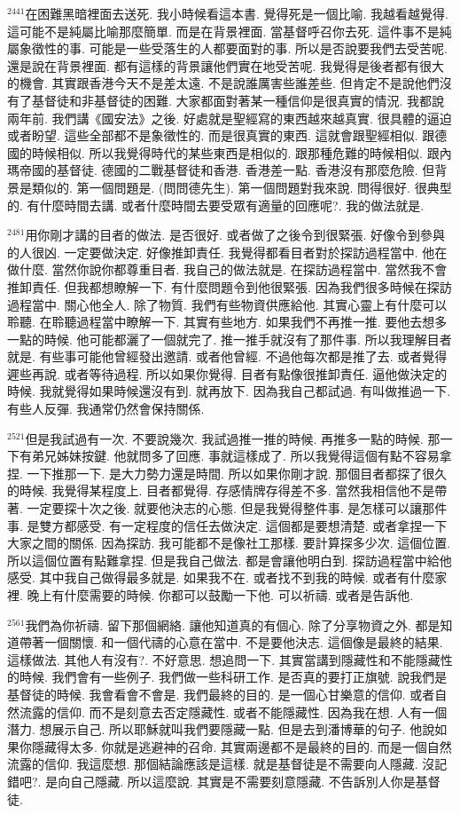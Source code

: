 \documentclass{book}
\begin{document}
$^{2441}$在困難黑暗裡面去送死.
我小時候看這本書.
覺得死是一個比喻.
我越看越覺得.
這可能不是純屬比喻那麼簡單.
而是在背景裡面.
當基督呼召你去死.
這件事不是純屬象徵性的事.
可能是一些受落生的人都要面對的事.
所以是否說要我們去受苦呢.
還是說在背景裡面.
都有這樣的背景讓他們實在地受苦呢.
我覺得是後者都有很大的機會.
其實跟香港今天不是差太遠.
不是說誰厲害些誰差些.
但肯定不是說他們沒有了基督徒和非基督徒的困難.
大家都面對著某一種信仰是很真實的情況.
我都說兩年前.
我們講《國安法》之後.
好處就是聖經寫的東西越來越真實.
很具體的逼迫或者盼望.
這些全部都不是象徵性的.
而是很真實的東西.
這就會跟聖經相似.
跟德國的時候相似.
所以我覺得時代的某些東西是相似的.
跟那種危難的時候相似.
跟內瑪帝國的基督徒.
德國的二戰基督徒和香港.
香港差一點.
香港沒有那麼危險.
但背景是類似的.
第一個問題是.
(問問德先生).
第一個問題對我來說.
問得很好.
很典型的.
有什麼時間去講.
或者什麼時間去要受眾有適量的回應呢?.
我的做法就是.

$^{2481}$用你剛才講的目者的做法.
是否很好.
或者做了之後令到很緊張.
好像令到參與的人很凶.
一定要做決定.
好像推卸責任.
我覺得都看目者對於探訪過程當中.
他在做什麼.
當然你說你都尊重目者.
我自己的做法就是.
在探訪過程當中.
當然我不會推卸責任.
但我都想瞭解一下.
有什麼問題令到他很緊張.
因為我們很多時候在探訪過程當中.
關心他全人.
除了物質.
我們有些物資供應給他.
其實心靈上有什麼可以聆聽.
在聆聽過程當中瞭解一下.
其實有些地方.
如果我們不再推一推.
要他去想多一點的時候.
他可能都灑了一個就完了.
推一推手就沒有了那件事.
所以我理解目者就是.
有些事可能他曾經發出邀請.
或者他曾經.
不過他每次都是推了去.
或者覺得遲些再說.
或者等待過程.
所以如果你覺得.
目者有點像很推卸責任.
逼他做決定的時候.
我就覺得如果時候還沒有到.
就再放下.
因為我自己都試過.
有叫做推過一下.
有些人反彈.
我通常仍然會保持關係.

$^{2521}$但是我試過有一次.
不要說幾次.
我試過推一推的時候.
再推多一點的時候.
那一下有弟兄姊妹按鍵.
他就問多了回應.
事就這樣成了.
所以我覺得這個有點不容易拿捏.
一下推那一下.
是大力勢力還是時間.
所以如果你剛才說.
那個目者都探了很久的時候.
我覺得某程度上.
目者都覺得.
存感情牌存得差不多.
當然我相信他不是帶著.
一定要探十次之後.
就要他決志的心態.
但是我覺得整件事.
是怎樣可以讓那件事.
是雙方都感受.
有一定程度的信任去做決定.
這個都是要想清楚.
或者拿捏一下大家之間的關係.
因為探訪.
我可能都不是像社工那樣.
要計算探多少次.
這個位置.
所以這個位置有點難拿捏.
但是我自己做法.
都是會讓他明白到.
探訪過程當中給他感受.
其中我自己做得最多就是.
如果我不在.
或者找不到我的時候.
或者有什麼家裡.
晚上有什麼需要的時候.
你都可以鼓勵一下他.
可以祈禱.
或者是告訴他.

$^{2561}$我們為你祈禱.
留下那個網絡.
讓他知道真的有個心.
除了分享物資之外.
都是知道帶著一個關懷.
和一個代禱的心意在當中.
不是要他決志.
這個像是最終的結果.
這樣做法.
其他人有沒有?.
不好意思.
想追問一下.
其實當講到隱藏性和不能隱藏性的時候.
我們會有一些例子.
我們做一些科研工作.
是否真的要打正旗號.
說我們是基督徒的時候.
我會看會不會是.
我們最終的目的.
是一個心甘樂意的信仰.
或者自然流露的信仰.
而不是刻意去否定隱藏性.
或者不能隱藏性.
因為我在想.
人有一個潛力.
想展示自己.
所以耶穌就叫我們要隱藏一點.
但是去到潘博華的句子.
他說如果你隱藏得太多.
你就是逃避神的召命.
其實兩邊都不是最終的目的.
而是一個自然流露的信仰.
我這麼想.
那個結論應該是這樣.
就是基督徒是不需要向人隱藏.
沒記錯吧?.
是向自己隱藏.
所以這麼說.
其實是不需要刻意隱藏.
不告訴別人你是基督徒.
\end{document}
